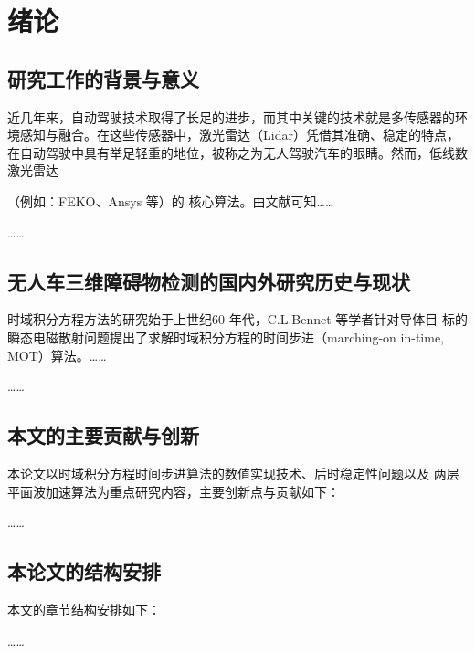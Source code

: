 
\chapter{绪论}
\section{研究工作的背景与意义}
近几年来，自动驾驶技术取得了长足的进步，而其中关键的技术就是多传感器的环境感知与融合。在这些传感器中，激光雷达（Lidar）凭借其准确、稳定的特点，在自动驾驶中具有举足轻重的地位，被称之为无人驾驶汽车的眼睛。然而，低线数激光雷达

（例如：FEKO、Ansys 等）的
核心算法。由文献\cite{feng997he,clerc2010discrete,xiao2012yi}可知……

……
\section{无人车三维障碍物检测的国内外研究历史与现状}
时域积分方程方法的研究始于上世纪60 年代，C.L.Bennet 等学者针对导体目
标的瞬态电磁散射问题提出了求解时域积分方程的时间步进（marching-on in-time,
MOT）算法。……

……
\section{本文的主要贡献与创新}
本论文以时域积分方程时间步进算法的数值实现技术、后时稳定性问题以及
两层平面波加速算法为重点研究内容，主要创新点与贡献如下：

……
\section{本论文的结构安排}
本文的章节结构安排如下：

……
